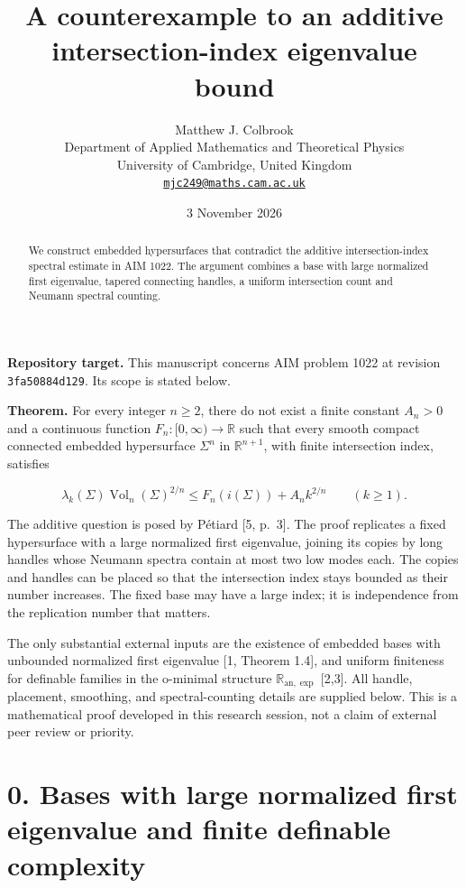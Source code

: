\documentclass[11pt,a4paper]{article}
\title{\textbf{A counterexample to an additive intersection-index eigenvalue bound}}
\author{Matthew J. Colbrook\\[3pt]
{\small Department of Applied Mathematics and Theoretical Physics}\\
{\small University of Cambridge, United Kingdom}\\
{\small\href{mailto:mjc249@maths.cam.ac.uk}{\texttt{mjc249@maths.cam.ac.uk}}}}
\date{3 November 2026}
\begin{document}
\maketitle
\begin{abstract}
We construct embedded hypersurfaces that contradict the additive intersection-index spectral estimate in AIM 1022. The argument combines a base with large normalized first eigenvalue, tapered connecting handles, a uniform intersection count and Neumann spectral counting.
\end{abstract}
\noindent\textbf{Repository target.}
This manuscript concerns AIM problem 1022 at revision
\texttt{3fa50884d129}. Its scope is stated below.
\medskip

\textbf{Theorem.} For every integer \(n\ge 2\), there do not exist a
finite constant \(A_n>0\) and a continuous function
\(F_n:[0,\infty)\to\mathbb R\) such that every smooth compact connected
embedded hypersurface \(\Sigma ^n\) in \(\mathbb R^{n+1}\), with finite
intersection index, satisfies

\[
 \lambda_k(\Sigma)\operatorname{Vol}_n(\Sigma)^{2/n}
 \le F_n(i(\Sigma))+A_n k^{2/n}\qquad(k\ge1).
\]

The additive question is posed by P\'etiard [5, p.~3].
The proof replicates a fixed hypersurface with a large normalized first
eigenvalue, joining its copies by long handles whose Neumann spectra
contain at most two low modes each. The copies and handles can be placed
so that the intersection index stays bounded as their number increases.
The fixed base may have a large index; it is independence from the
replication number that matters.

The only substantial external inputs are the existence of embedded bases
with unbounded normalized first eigenvalue {[}1, Theorem 1.4{]}, and
uniform finiteness for definable families in the o-minimal structure
\(\mathbb R_{\mathrm{an},\exp}\) {[}2,3{]}. All handle, placement,
smoothing, and spectral-counting details are supplied below. This is a
mathematical proof developed in this research session, not a claim of
external peer review or priority.

\hypertarget{1022-bases-with-large-normalized-first-eigenvalue-and-finite-definable-complexity}{%
\section{0. Bases with large normalized first eigenvalue and finite
definable
complexity}\label{1022-bases-with-large-normalized-first-eigenvalue-and-finite-definable-complexity}}
\end{document}
